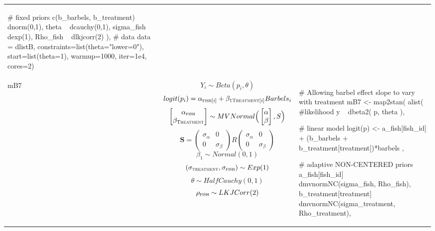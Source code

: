 \begin{longtable}{p{} |p{} |p{} }
{\begin{mylist}
    # fixed priors
    c(b_barbels, b_treatment) ~ dnorm(0,1),
    theta ~ dcauchy(0,1),
    sigma_fish ~ dexp(1),
    Rho_fish ~ dlkjcorr(2)
  ),
  # data
  data = dlistB,
  constraints=list(theta="lower=0"),
  start=list(theta=1), warmup=1000, iter=1e4, cores=2) \end{mylist}}
\\ %
mB7& %
$$ Y_i \sim Beta(p_i, \theta) $$
\small $$ logit(p_i) =  \alpha_{\textsc{fish}[i]} + \beta_{\textsc{1Treatment}[i]}Barbels_i$$
$$
\begin{bmatrix}
\alpha_{\textsc{fish}} \\
\beta_{\textsc{Treatment}} \\
\end{bmatrix} \sim MVNormal \Big(
\begin{bmatrix}
\alpha \\
\beta \\
\end{bmatrix}, S \Big)
$$
$$
\mathbf{S} = \left( \begin{array}{cc}
\sigma_\alpha & 0 \\
0 & \sigma_\beta
\end{array} \right) R \left( \begin{array}{cc}
\sigma_\alpha & 0 \\
0 & \sigma_\beta
\end{array} \right)
$$
$$ \beta_1  \sim Normal(0,1) $$
$$ (\sigma_{\textsc{treatment}}, \sigma_{\textsc{fish}}) \sim Exp(1) $$
$$ \theta \sim HalfCauchy(0, 1) $$
$$ \rho_{\textsc{fish}} \sim LKJCorr(2) $$
&
{\begin{mylist} %

#  Allowing barbel effect slope to vary with treatment
mB7 <- map2stan(
  alist(
    #likelihood
    y ~ dbeta2( p, theta ),
    
    # linear model
    logit(p) <- a_fish[fish_id] + (b_barbels + 
    b_treatment[treatment])*barbels ,
    
    # adaptive NON-CENTERED priors 
    a_fish[fish_id] ~ dmvnormNC(sigma_fish, Rho_fish),
    b_treatment[treatment] ~ 
    dmvnormNC(sigma_treatment, Rho_treatment),
    

\end{mylist}}
\end{longtable}
